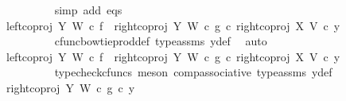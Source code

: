\begin{isabellebody}
\ \ \ \ \ \ \ \ \ \ \isamarkupfalse%
\ {\isacharparenleft}{\kern0pt}simp\ add{\isacharcolon}{\kern0pt}\ eqs{\isacharparenright}{\kern0pt}\isanewline
\ \ \ \ \ \ \ \ \isamarkupfalse%
\ \isamarkupfalse%
\ {\isachardoublequoteopen}{\isachardot}{\kern0pt}{\isachardot}{\kern0pt}{\isachardot}{\kern0pt}\ {\isacharequal}{\kern0pt}\ {\isacharparenleft}{\kern0pt}{\isacharparenleft}{\kern0pt}left{\isacharunderscore}{\kern0pt}coproj\ Y\ W\ {\isasymcirc}\isactrlsub c\ f{\isacharparenright}{\kern0pt}\ {\isasymamalg}\ {\isacharparenleft}{\kern0pt}right{\isacharunderscore}{\kern0pt}coproj\ Y\ W\ {\isasymcirc}\isactrlsub c\ g{\isacharparenright}{\kern0pt}{\isacharparenright}{\kern0pt}\ {\isasymcirc}\isactrlsub c\ right{\isacharunderscore}{\kern0pt}coproj\ X\ V\ {\isasymcirc}\isactrlsub c\ y{}{\isachardoublequoteclose}\isanewline
\ \ \ \ \ \ \ \ \ \ \isamarkupfalse%
\ cfunc{\isacharunderscore}{\kern0pt}bowtie{\isacharunderscore}{\kern0pt}prod{\isacharunderscore}{\kern0pt}def{}\ type{\isacharunderscore}{\kern0pt}assms\ y{}{\isacharunderscore}{\kern0pt}def\ \isamarkupfalse%
\ auto\isanewline
\ \ \ \ \ \ \ \ \isamarkupfalse%
\ \isamarkupfalse%
\ {\isachardoublequoteopen}{\isachardot}{\kern0pt}{\isachardot}{\kern0pt}{\isachardot}{\kern0pt}\ {\isacharequal}{\kern0pt}\ {\isacharparenleft}{\kern0pt}{\isacharparenleft}{\kern0pt}{\isacharparenleft}{\kern0pt}left{\isacharunderscore}{\kern0pt}coproj\ Y\ W\ {\isasymcirc}\isactrlsub c\ f{\isacharparenright}{\kern0pt}\ {\isasymamalg}\ {\isacharparenleft}{\kern0pt}right{\isacharunderscore}{\kern0pt}coproj\ Y\ W\ {\isasymcirc}\isactrlsub c\ g{\isacharparenright}{\kern0pt}{\isacharparenright}{\kern0pt}\ {\isasymcirc}\isactrlsub c\ right{\isacharunderscore}{\kern0pt}coproj\ X\ V{\isacharparenright}{\kern0pt}\ {\isasymcirc}\isactrlsub c\ y{}{\isachardoublequoteclose}\isanewline
\ \ \ \ \ \ \ \ \ \ \isamarkupfalse%
\ {\isacharparenleft}{\kern0pt}typecheck{\isacharunderscore}{\kern0pt}cfuncs{\isacharcomma}{\kern0pt}\ meson\ comp{\isacharunderscore}{\kern0pt}associative{}\ type{\isacharunderscore}{\kern0pt}assms\ y{}{\isacharunderscore}{\kern0pt}def{\isacharparenright}{\kern0pt}\isanewline
\ \ \ \ \ \ \ \ \isamarkupfalse%
\ \isamarkupfalse%
\ {\isachardoublequoteopen}{\isachardot}{\kern0pt}{\isachardot}{\kern0pt}{\isachardot}{\kern0pt}\ {\isacharequal}{\kern0pt}\ {\isacharparenleft}{\kern0pt}right{\isacharunderscore}{\kern0pt}coproj\ Y\ W\ {\isasymcirc}\isactrlsub c\ g{\isacharparenright}{\kern0pt}\ {\isasymcirc}\isactrlsub c\ y{}{\isachardoublequoteclose}\isanewline

\end{isabellebody}
